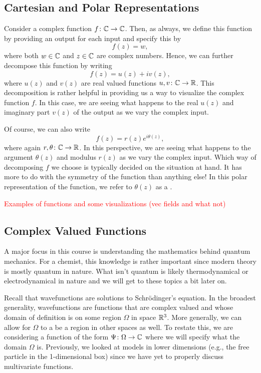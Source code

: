 \subsection{Cartesian and Polar Representations}

Consider a complex function $f\colon \mathbb{C} \to \mathbb{C}$.  Then, as always, we define this function by providing an output for each input and specify this by
\[
f(z)=w,
\]
where both $w\in \mathbb{C}$ and $z\in \mathbb{C}$ are complex numbers.  Hence, we can further decompose this function by writing
\[
f(z)=u(z)+iv(z),
\]
where $u(z)$ and $v(z)$ are real valued functions $u,v\colon \mathbb{C} \to \mathbb{R}$.  This decomposition is rather helpful in providing us a way to visualize the complex function $f$.  In this case, we are seeing what happens to the real $u(z)$ and imaginary part $v(z)$ of the output as we vary the complex input.

Of course, we can also write
\[
f(z)=r(z)e^{i\theta(z)},
\]
where again $r,\theta \colon \mathbb{C} \to \mathbb{R}$.  In this perspective, we are seeing what happens to the argument $\theta(z)$ and modulus $r(z)$ as we vary the complex input.  Which way of decomposing $f$ we choose is typically decided on the situation at hand.  It has more to do with the symmetry of the function than anything else! In this polar representation of the function, we refer to $\theta(z)$ as a .  

\textcolor{red}{Examples of functions and some visualizations (vec fields and what not)}

\subsection{Complex Valued Functions}

A major focus in this course is understanding the mathematics behind quantum mechanics.  For a chemist, this knowledge is rather important since modern theory is mostly quantum in nature.  What isn't quantum is likely thermodynamical or electrodynamical in nature and we will get to these topics a bit later on. 

Recall that wavefunctions are solutions to Schr\"odinger's equation.  In the broadest generality, wavefunctions are functions that are complex valued and whose domain of definition is on some region $\Omega$ in space $\mathbb{R}^3$.  More generally, we can allow for $\Omega$ to a be a region in other spaces as well. To restate this, we are considering a function of the form $\Psi\colon \Omega \to \mathbb{C}$ where we will specify what the domain $\Omega$ is. Previously, we looked at models in lower dimensions (e.g., the free particle in the 1-dimensional box) since we have yet to properly discuss multivariate functions.  

